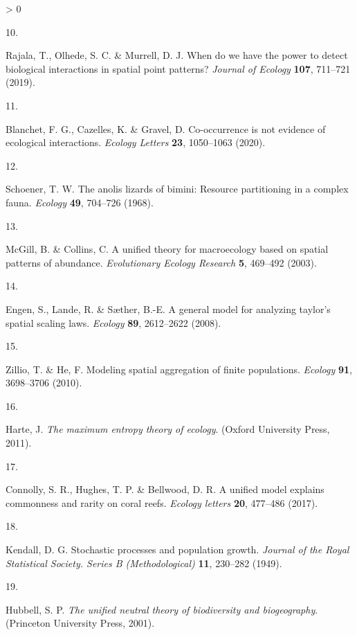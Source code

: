 \documentclass[
]{article}
\newlength{\cslhangindent}
\newlength{\csllabelwidth}
\newenvironment{CSLReferences}[2] %
 {%
  \setlength{\parindent}{0pt}
  \ifodd #1 \everypar{\setlength{\hangindent}{\cslhangindent}}\ignorespaces\fi
  \ifnum #2 > 0
  \setlength{\parskip}{#2\baselineskip}
  \fi
 }%
 {}
\newcommand{\CSLLeftMargin}[1]{\parbox[t]{\csllabelwidth}{#1}}
\newcommand{\CSLRightInline}[1]{\parbox[t]{\linewidth - \csllabelwidth}{#1}\break}
\begin{document}
\begin{CSLReferences}{0}{0}
\leavevmode\hypertarget{ref-rajala2019}{}%
\CSLLeftMargin{10. }
\CSLRightInline{Rajala, T., Olhede, S. C. \& Murrell, D. J. When do we
have the power to detect biological interactions in spatial point
patterns? \emph{Journal of Ecology} \textbf{107}, 711--721 (2019).}

\leavevmode\hypertarget{ref-blanchet2020}{}%
\CSLLeftMargin{11. }
\CSLRightInline{Blanchet, F. G., Cazelles, K. \& Gravel, D.
Co-occurrence is not evidence of ecological interactions. \emph{Ecology
Letters} \textbf{23}, 1050--1063 (2020).}

\leavevmode\hypertarget{ref-schoener1968}{}%
\CSLLeftMargin{12. }
\CSLRightInline{Schoener, T. W. The anolis lizards of bimini: Resource
partitioning in a complex fauna. \emph{Ecology} \textbf{49}, 704--726
(1968).}

\leavevmode\hypertarget{ref-mcgill2003}{}%
\CSLLeftMargin{13. }
\CSLRightInline{McGill, B. \& Collins, C. A unified theory for
macroecology based on spatial patterns of abundance. \emph{Evolutionary
Ecology Research} \textbf{5}, 469--492 (2003).}

\leavevmode\hypertarget{ref-engen2008}{}%
\CSLLeftMargin{14. }
\CSLRightInline{Engen, S., Lande, R. \& Sæther, B.-E. A general model
for analyzing taylor's spatial scaling laws. \emph{Ecology} \textbf{89},
2612--2622 (2008).}

\leavevmode\hypertarget{ref-zillio2010}{}%
\CSLLeftMargin{15. }
\CSLRightInline{Zillio, T. \& He, F. Modeling spatial aggregation of
finite populations. \emph{Ecology} \textbf{91}, 3698--3706 (2010).}

\leavevmode\hypertarget{ref-harte2011}{}%
\CSLLeftMargin{16. }
\CSLRightInline{Harte, J. \emph{The maximum entropy theory of ecology}.
(Oxford University Press, 2011).}

\leavevmode\hypertarget{ref-connolly2017}{}%
\CSLLeftMargin{17. }
\CSLRightInline{Connolly, S. R., Hughes, T. P. \& Bellwood, D. R. A
unified model explains commonness and rarity on coral reefs.
\emph{Ecology letters} \textbf{20}, 477--486 (2017).}

\leavevmode\hypertarget{ref-kendall1949}{}%
\CSLLeftMargin{18. }
\CSLRightInline{Kendall, D. G. Stochastic processes and population
growth. \emph{Journal of the Royal Statistical Society. Series B
(Methodological)} \textbf{11}, 230--282 (1949).}

\leavevmode\hypertarget{ref-hubbell2001}{}%
\CSLLeftMargin{19. }
\CSLRightInline{Hubbell, S. P. \emph{The unified neutral theory of
biodiversity and biogeography}. (Princeton University Press, 2001).}


\end{CSLReferences}
\end{document}
